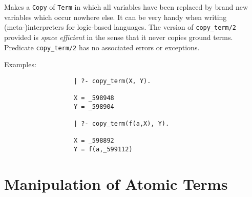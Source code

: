\begin{description}
    Makes a {\tt Copy} of {\tt Term} in which all variables have been
    replaced by brand new variables which occur nowhere else. It can
    be very handy when writing (meta-)interpreters for logic-based
    languages.  The version of {\tt copy\_term/2} provided is {\em space
    efficient} in the sense that it never copies ground terms. 
    Predicate {\tt copy\_term/2} has no associated errors or exceptions.

    Examples:
    {\footnotesize
     \begin{verbatim}
                   | ?- copy_term(X, Y).

                   X = _598948
                   Y = _598904

                   | ?- copy_term(f(a,X), Y).

                   X = _598892
                   Y = f(a,_599112)
     \end{verbatim}}

\end{description}

\section{Manipulation of Atomic Terms}

